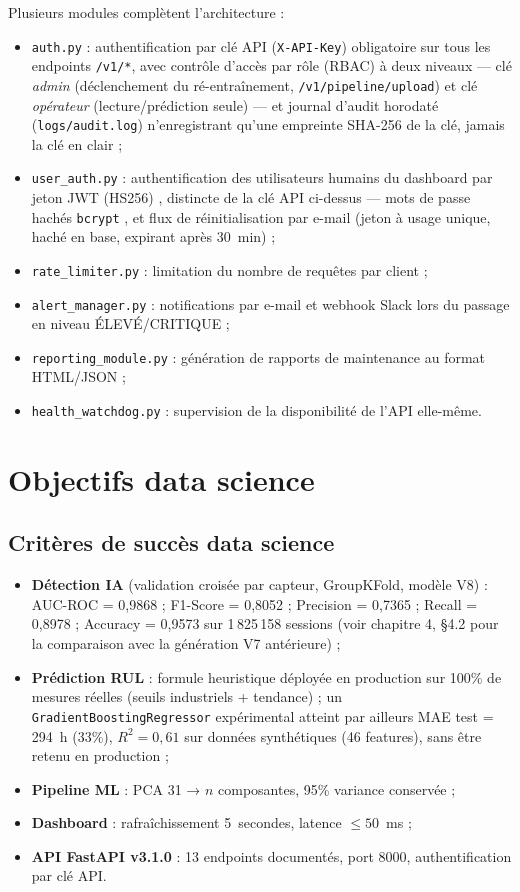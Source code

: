 \documentclass[12pt,a4paper]{report}
\begin{document}
Plusieurs modules complètent l'architecture :
\begin{itemize}
  \item \texttt{auth.py} : authentification par clé API (\texttt{X-API-Key}) obligatoire sur tous les endpoints \texttt{/v1/*}, avec contrôle d'accès par rôle (RBAC) à deux niveaux — clé \textit{admin} (déclenchement du ré-entraînement, \texttt{/v1/pipeline/upload}) et clé \textit{opérateur} (lecture/prédiction seule) — et journal d'audit horodaté (\texttt{logs/audit.log}) n'enregistrant qu'une empreinte SHA-256 de la clé, jamais la clé en clair ;
  \item \texttt{user\_auth.py} : authentification des utilisateurs humains du dashboard par jeton JWT (HS256) \cite{jones2015}, distincte de la clé API ci-dessus — mots de passe hachés \texttt{bcrypt} \cite{provos1999}, et flux de réinitialisation par e-mail (jeton à usage unique, haché en base, expirant après 30~min) ;
  \item \texttt{rate\_limiter.py} : limitation du nombre de requêtes par client ;
  \item \texttt{alert\_manager.py} : notifications par e-mail et webhook Slack lors du passage en niveau ÉLEVÉ/CRITIQUE ;
  \item \texttt{reporting\_module.py} : génération de rapports de maintenance au format HTML/JSON ;
  \item \texttt{health\_watchdog.py} : supervision de la disponibilité de l'API elle-même.
\end{itemize}

\section{Objectifs data science}

\subsection{Critères de succès data science}

\begin{itemize}
  \item \textbf{Détection IA} (validation croisée par capteur, GroupKFold, modèle V8) : AUC-ROC = 0,9868 ; F1-Score = 0,8052 ; Precision = 0,7365 ; Recall = 0,8978 ; Accuracy = 0,9573 sur 1\,825\,158 sessions (voir chapitre 4, §4.2 pour la comparaison avec la génération V7 antérieure) ;
  \item \textbf{Prédiction RUL} : formule heuristique déployée en production sur 100\% de mesures réelles (seuils industriels + tendance) ; un \texttt{GradientBoostingRegressor} expérimental atteint par ailleurs MAE test = 294~h (33\%), $R^2 = 0{,}61$ sur données synthétiques (46 features), sans être retenu en production ;
  \item \textbf{Pipeline ML} : PCA 31 → $n$ composantes, 95\% variance conservée ;
  \item \textbf{Dashboard} : rafraîchissement 5~secondes, latence $\leq 50$~ms ;
  \item \textbf{API FastAPI v3.1.0} : 13 endpoints documentés, port 8000, authentification par clé API.
\end{itemize}
\end{document}
